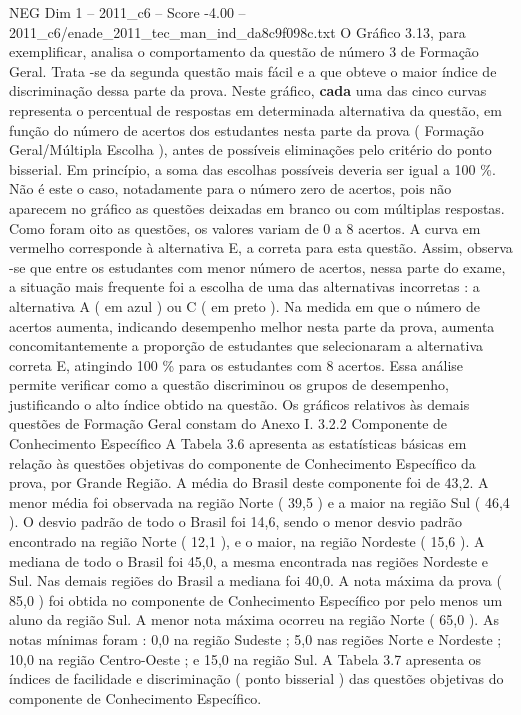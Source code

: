 \begin{textsample}{NEG Dim 1 – 2011\_c6 – Score -4.00 – 2011\_c6/enade\_2011\_tec\_man\_ind\_da8c9f098c.txt}
O Gráfico 3.13, para exemplificar, analisa o comportamento da questão de número 3 de Formação Geral.
Trata -se da segunda questão mais fácil e a que obteve o maior índice de discriminação dessa parte da prova.
Neste gráfico, \textbf{cada} uma das cinco curvas representa o percentual de respostas em determinada alternativa da questão, em função do número de acertos dos estudantes nesta parte da prova ( Formação Geral/Múltipla Escolha ), antes de possíveis eliminações pelo critério do ponto bisserial.
Em princípio, a soma das escolhas possíveis deveria ser igual a 100 \%.
Não é este o caso, notadamente para o número zero de acertos, pois não aparecem no gráfico as questões deixadas em branco ou com múltiplas respostas.
Como foram oito as questões, os valores variam de 0 a 8 acertos.
A curva em vermelho corresponde à alternativa E, a correta para esta questão.
Assim, observa -se que entre os estudantes com menor número de acertos, nessa parte do exame, a situação mais frequente foi a escolha de uma das alternativas incorretas : a alternativa A ( em azul ) ou C ( em preto ).
Na medida em que o número de acertos aumenta, indicando desempenho melhor nesta parte da prova, aumenta concomitantemente a proporção de estudantes que selecionaram a alternativa correta E, atingindo 100 \% para os estudantes com 8 acertos.
Essa análise permite verificar como a questão discriminou os grupos de desempenho, justificando o alto índice obtido na questão.
Os gráficos relativos às demais questões de Formação Geral constam do Anexo I. 3.2.2 Componente de Conhecimento Específico A Tabela 3.6 apresenta as estatísticas básicas em relação às questões objetivas do componente de Conhecimento Específico da prova, por Grande Região.
A média do Brasil deste componente foi de 43,2.
A menor média foi observada na região Norte ( 39,5 ) e a maior na região Sul ( 46,4 ).
O desvio padrão de todo o Brasil foi 14,6, sendo o menor desvio padrão encontrado na região Norte ( 12,1 ), e o maior, na região Nordeste ( 15,6 ).
A mediana de todo o Brasil foi 45,0, a mesma encontrada nas regiões Nordeste e Sul.
Nas demais regiões do Brasil a mediana foi 40,0.
A nota máxima da prova ( 85,0 ) foi obtida no componente de Conhecimento Específico por pelo menos um aluno da região Sul.
A menor nota máxima ocorreu na região Norte ( 65,0 ).
As notas mínimas foram : 0,0 na região Sudeste ; 5,0 nas regiões Norte e Nordeste ; 10,0 na região Centro-Oeste ; e 15,0 na região Sul.
A Tabela 3.7 apresenta os índices de facilidade e discriminação ( ponto bisserial ) das questões objetivas do componente de Conhecimento Específico.

\end{textsample}
